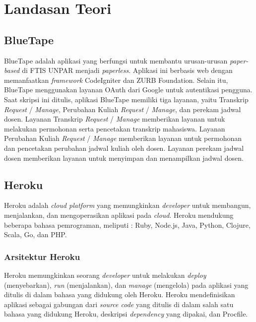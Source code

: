 
\chapter{Landasan Teori}
\label{chap:teori}
\setcounter{secnumdepth}{3}



\section{BlueTape}
\label{sec:BlueTape}
BlueTape adalah aplikasi yang berfungsi untuk membantu urusan-urusan \textit{paper-based} di FTIS UNPAR menjadi \textit{paperless}. Aplikasi ini berbasis web dengan memanfaatkan \textit{framework} CodeIgniter dan ZURB Foundation. Selain itu, BlueTape menggunakan layanan OAuth dari Google untuk autentikasi pengguna. Saat skripsi ini ditulis, aplikasi BlueTape memiliki tiga layanan, yaitu Transkrip \textit{Request} / \textit{Manage}, Perubahan Kuliah \textit{Request} / \textit{Manage}, dan perekam jadwal dosen. Layanan Transkrip \textit{Request} / \textit{Manage} memberikan layanan untuk melakukan permohonan serta pencetakan transkrip mahasiswa. Layanan Perubahan Kuliah \textit{Request} / \textit{Manage} memberikan layanan untuk permohonan dan pencetakan perubahan jadwal kuliah oleh dosen. Layanan perekam jadwal dosen memberikan layanan untuk menyimpan dan menampilkan jadwal dosen. \footnotemark
{}


\section{Heroku ~\cite{heroku}}
\label{sec:Heroku}
Heroku adalah \textit{cloud platform} yang memungkinkan \textit{developer} untuk membangun, menjalankan, dan mengoperasikan aplikasi pada \textit{cloud}. Heroku mendukung beberapa bahasa pemrograman, meliputi : Ruby, Node.js, Java, Python, Clojure, Scala, Go, dan PHP.

\subsection{Arsitektur Heroku}
Heroku memungkinkan seorang \textit{developer} untuk melakukan \textit{deploy} (menyebarkan), \textit{run} (menjalankan), dan \textit{manage} (mengelola) pada aplikasi yang ditulis di dalam bahasa yang didukung oleh Heroku. Heroku mendefinisikan aplikasi sebagai gabungan dari \textit{source code} yang ditulis di dalam salah satu bahasa yang didukung Heroku, deskripsi \textit{dependency} yang dipakai, dan Procfile.


